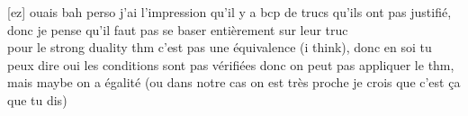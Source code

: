 \documentclass{article}
\begin{document}
[ez] ouais bah perso j'ai l'impression qu'il y a bcp de trucs qu'ils ont pas justifié, donc je pense qu'il faut pas se baser entièrement sur leur truc\\
pour le strong duality thm c'est pas une équivalence (i think), donc en soi tu peux dire oui les conditions sont pas vérifiées donc on peut pas appliquer le thm, mais maybe on a égalité (ou dans notre cas on est très proche je crois que c'est ça que tu dis)
\end{document}
